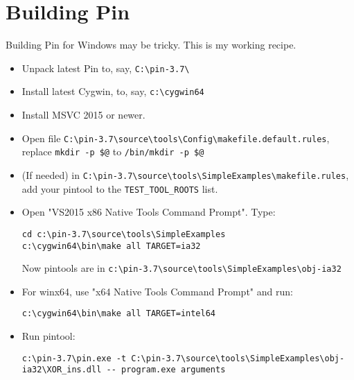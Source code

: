 \section{Building Pin}

Building Pin for Windows may be tricky.
This is my working recipe.

\begin{itemize}

\item Unpack latest Pin to, say, \verb|C:\pin-3.7\|

\item Install latest Cygwin, to, say, \verb|c:\cygwin64|

\item Install MSVC 2015 or newer.

\item Open file \verb|C:\pin-3.7\source\tools\Config\makefile.default.rules|, replace \verb|mkdir -p $@| to \verb|/bin/mkdir -p $@|

\item (If needed) in \verb|C:\pin-3.7\source\tools\SimpleExamples\makefile.rules|, add your pintool to the \verb|TEST_TOOL_ROOTS| list.

\item Open "VS2015 x86 Native Tools Command Prompt". Type:

\begin{lstlisting}
cd c:\pin-3.7\source\tools\SimpleExamples
c:\cygwin64\bin\make all TARGET=ia32
\end{lstlisting}

Now pintools are in \verb|c:\pin-3.7\source\tools\SimpleExamples\obj-ia32|

\item For winx64, use "x64 Native Tools Command Prompt" and run:

\begin{lstlisting}
c:\cygwin64\bin\make all TARGET=intel64
\end{lstlisting}

\item Run pintool:

\begin{lstlisting}
c:\pin-3.7\pin.exe -t C:\pin-3.7\source\tools\SimpleExamples\obj-ia32\XOR_ins.dll -- program.exe arguments
\end{lstlisting}

\end{itemize}

